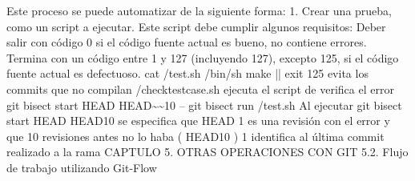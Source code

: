 \documentclass[12pt, spanish, oneside, onecolumn, a4paper]{report}
\begin{document}
Este proceso se puede automatizar de la siguiente forma:
1. Crear una prueba, como un script a ejecutar. Este script debe cumplir algunos requisitos:
Deber salir con código 0 si el código fuente actual es bueno, no contiene errores.
Termina con un código entre 1 y 127 (incluyendo 127), excepto 125, si el código fuente actual es defectuoso.
 cat /test.sh /bin/sh make || exit 125  evita los commits que no compilan /checktestcase.sh  ejecuta el script de verifica el error  git bisect start HEAD HEAD\~{}\~{}10 --  git bisect run /test.sh
Al ejecutar git bisect start HEAD HEAD10 se especifica que HEAD 1 es una revisión con el error y que 10 revisiones antes no lo haba ( HEAD10 ) 1 identifica al última commit realizado a la rama
 CAPTULO 5. OTRAS OPERACIONES CON GIT 5.2. Flujo de trabajo utilizando Git-Flow

















\glsaddall
\printglossaries
\end{document}
